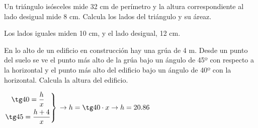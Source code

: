 \documentclass[addpoints,spanish, 12pt,a4paper]{exam}
\begin{document}
\begin{questions}
\begin{parts}
\part[]$\dfrac{2x-2}{1-3x}<-\dfrac{2}{3} $  
\begin{solution} $\left(-\infty, \frac{1}{3}\right)$\end{solution}

\end{parts}

\question[2] Un triángulo isósceles mide 32 cm de perímetro y la altura correspondiente al lado
desigual mide 8 cm. Calcula los lados del triángulo y su áreaz.
\begin{solution}
Los lados iguales miden 10 cm, y el lado desigual, 12 cm.
\end{solution}

\question[2]   En lo alto de un edificio en construcción hay una grúa de 4 m. Desde un punto del
suelo se ve el punto más alto de la grúa bajo un ángulo de 45º con respecto a la horizontal y el punto más alto del edificio bajo un ángulo de 40º con la horizontal. Calcula la
altura del edificio.
\begin{solution} $\left. \begin{gathered}
	  \tg 40 = \frac{h}{x} \\
	  \tg 45 = \frac{h+4}{x} \hfill
	 \end{gathered}  \right\rbrace \\
	 \to 
	 h= \tg 40 \cdot x \to h = 20.86    $ \end{solution}


\end{questions}
\end{document}
